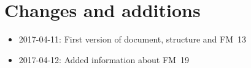 \chapter{Changes and additions}
\begin{itemize}
    \item 2017-04-11: First version of document, structure and FM~13
    \item 2017-04-12: Added information about FM~19
\end{itemize}
